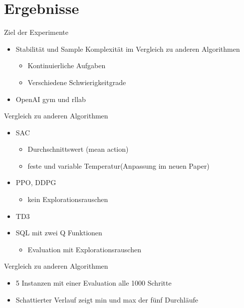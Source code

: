 \section{Ergebnisse}

\begin{frame}{Ziel der Experimente}
        \begin{itemize}
            \item Stabilität und Sample Komplexität im Vergleich zu anderen Algorithmen
            \begin{itemize}
                \item Kontinuierliche Aufgaben
                \item Verschiedene Schwierigkeitgrade
            \end{itemize}  
            \item OpenAI gym und rllab
        \end{itemize}
\end{frame}

\begin{frame}{Vergleich zu anderen Algorithmen}
    \begin{itemize}
        \item SAC
        \begin{itemize}
            \item Durchschnittswert (mean action)
            \item feste und variable Temperatur(Anpassung im neuen Paper)
        \end{itemize} 
        \item PPO, DDPG
        \begin{itemize}
            \item kein Explorationsrauschen
        \end{itemize}
        \item TD3
        \item SQL mit zwei Q Funktionen
        \begin{itemize}
            \item Evaluation mit Explorationsrauschen        
        \end{itemize}
    \end{itemize}
\end{frame}

\begin{frame}{Vergleich zu anderen Algorithmen}
    \begin{itemize}     
        \item 5 Instanzen mit einer Evaluation alle 1000 Schritte
        \item Schattierter Verlauf zeigt min und max der fünf Durchläufe
    \end{itemize}
    
\end{frame}

